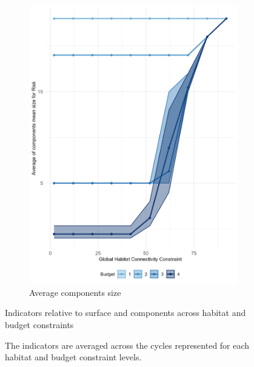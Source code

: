 \begin{figure}[h]
    \begin{subfigure}[b]{.48\textwidth}
        \centering
        \includegraphics[height = .4\textheight]{figures/wildland/average_components_mean_size.jpg}
        \caption{Average components size}
        \label{fig:components_size}
    \end{subfigure}
    
    \caption{Indicators relative to surface and components across habitat and budget constraints}
    \caption*{The indicators are averaged across the cycles represented for each habitat and budget constraint levels.}
    \label{fig:indicators1}
\end{figure}


